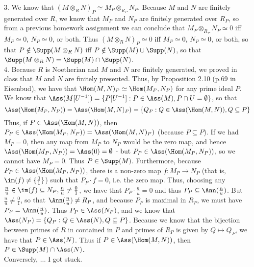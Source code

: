 \documentclass[11pt]{article}
\begin{document}
\num{3.} We know that $(M\otimes_R N)_P\simeq M_P\otimes_{R_P}N_P$. Because
$M$ and $N$ are finitely generated over $R$, we know that $M_P$ and $N_P$ are
finitely generated over $R_P$, so from a previous homework assignment we can
conclude that $M_P\otimes_{R_P}N_P\simeq 0$ iff $M_P\simeq 0$, $N_P\simeq 0$,
or both. Thus $(M\otimes_R N)_P\simeq 0$ iff $M_P\simeq 0$, $N_P\simeq 0$, or
both, so that $P\notin\Supp(M\otimes_R N)$ iff $P\notin\Supp(M)\cup\Supp(N)$,
so that $\Supp(M\otimes_R N)=\Supp(M)\cap\Supp(N)$.     \\

\num{4.} Because $R$ is Noetherian and $M$ and $N$ are finitely generated, we
proved in class that $M$ and $N$ are finitely presented. Thus, by Proposition
2.10 (p.69 in Eisenbud), we have that $\Hom(M,N)_P\simeq\Hom(M_P,N_P)$ for any
prime ideal $P$. We know that $\Ass(M[U^{-1}])=\{P[U^{-1}]:P\in\Ass(M),P\cap
U=\emptyset\}$, so that 
\[\Ass(\Hom(M_P,N_P))=\Ass(\Hom(M,N)_P)=\{Q_P:Q\in\Ass(\Hom(M,N)),Q\subseteq
P\}\]
Thus, if $P\in\Ass(\Hom(M,N))$, then
$P_P\in\Ass(\Hom(M_P,N_P))=\Ass(\Hom(M,N)_P)$ (because $P\subseteq P$). If we
had $M_P=0$, then any map from $M_P$ to $N_P$ would be the zero map, and hence
$\Ass(\Hom(M_P,N_P))=\Ass(0)=\emptyset$ - but $P_P\in\Ass(\Hom(M_P,N_P))$,
so we cannot have $M_P=0$. Thus $P\in\Supp(M)$. Furthermore, because
$P_P\in\Ass(\Hom(M_P,N_P))$, there is a non-zero map $f:M_P\rightarrow
N_P$ (that is, $\im(f)\neq\{\frac{0}{1}\}$) such that $P_P\cdot f=0$,
i.e. the zero map. Thus, choosing any $\frac{n}{u}\in\im(f)\subseteq N_P,
\frac{n}{u}\neq\frac{0}{1}$, we have that $P_P\cdot\frac{n}{u}=0$ and
thus $P_P\subseteq\Ann(\frac{n}{u})$. But $\frac{n}{u}\neq\frac{0}{1}$, so
that $\Ann(\frac{n}{u})\neq R_P$, and because $P_P$ is maximal in $R_P$,
we must have $P_P=\Ann(\frac{n}{u})$. Thus $P_P\in\Ass(N_P)$, and we
know that $\Ass(N_P)=\{Q_P:Q\in\Ass(N),Q\subseteq P\}$. Because we know
that the bijection between primes of $R$ in contained in $P$ and primes
of $R_P$ is given by $Q\mapsto Q_P$, we have that $P\in\Ass(N)$. Thus if
$P\in\Ass(\Hom(M,N))$, then $P\in\Supp(M)\cap\Ass(N)$.      \\

Conversely, $\ldots$ I got stuck.\\ 
\end{document}
